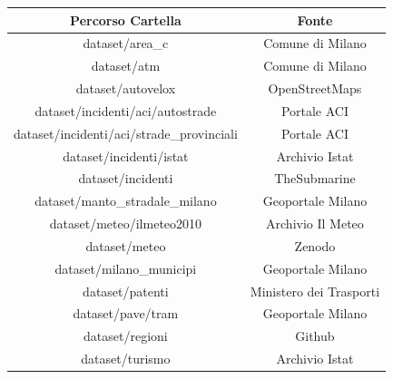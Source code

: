 \documentclass[a4paper,12pt]{report}
\begin{document}
\begin{center}
    \def\arraystretch{1.5}%
    \begin{tabular}{ |c|c| } 
    \hline
    Percorso Cartella & Fonte \\ 
    \hline
    \rowcolor{TableGray}
    dataset/area\_c & Comune di Milano\footnotemark[1] \\
    dataset/atm & Comune di Milano\footnotemark[2] \\
    \rowcolor{TableGray}
    dataset/autovelox & OpenStreetMaps\footnotemark[3] \\
    dataset/incidenti/aci/autostrade & Portale ACI\footnotemark[4] \\
    \rowcolor{TableGray}
    dataset/incidenti/aci/strade\_provinciali & Portale ACI\footnotemark[5] \\
    dataset/incidenti/istat & Archivio Istat\footnotemark[5]\\
    \rowcolor{TableGray}
    dataset/incidenti & TheSubmarine\footnotemark[7]\\
    dataset/manto\_stradale\_milano & Geoportale Milano\footnotemark[8]\\
    \rowcolor{TableGray}
    dataset/meteo/ilmeteo2010 & Archivio Il Meteo\footnotemark[9]\\
    dataset/meteo & Zenodo\footnotemark[10]\\
    \rowcolor{TableGray}
    dataset/milano\_municipi & Geoportale Milano\footnotemark[11]\\
    dataset/patenti & Ministero dei Trasporti\footnotemark[12]\\
    \rowcolor{TableGray}
    dataset/pave/tram & Geoportale Milano\footnotemark[13]\\
    dataset/regioni & Github\footnotemark[14]\\
    \rowcolor{TableGray}
    dataset/turismo & Archivio Istat\footnotemark[15]\\
    \hline
    \end{tabular}
\end{center}
\end{document}
